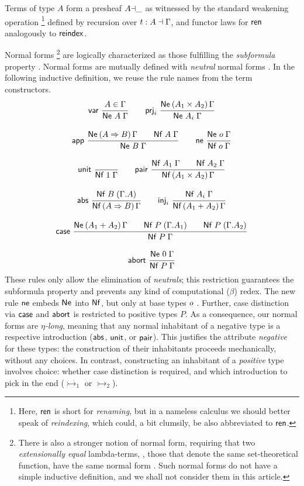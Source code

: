 \documentclass[sigplan,screen]{acmart}
\begin{document}
Terms of type $A$ form a presheaf
$A{\dashv}\_$ as witnessed by the standard weakening operation%
\footnote{Here, $\mathsf{ren}$ is short for \emph{renaming}, but in a nameless
calculus we should better speak of \emph{reindexing}, which could, a
bit clumsily, be also abbreviated to $\mathsf{ren}$.}
defined by recursion over $t : A \dashv \Gamma$,
and functor laws for $\mathsf{ren}$ analogously to $\mathsf{reindex}$.

Normal forms%
\footnote{%
There is also a stronger
notion of normal form, requiring that two \emph{extensionally equal}
lambda-terms, \ie, those that denote the
same set-theoretical function, have the same normal form
\cite{mitchell:foundations,altenkirchDybjerHofmannScott:lics01,scherer:popl17}.
Such normal forms do not have a simple inductive definition, and we
shall not consider them in this article.
}
are logically characterized as those fulfilling the
\emph{subformula} property \cite{prawitz:natded,matthes:shortproofs}.
Normal forms  are mutually defined with
\emph{neutral} normal forms .
In the following inductive definition, we reuse the rule names from the
term constructors.
\begin{gather*}
  \nru{\tvar}{A \in \Gamma}{\Ne A \Gamma}
\qquad
  \nru{\tprj_i}
    {\NeP {A_1 \times A_2} \Gamma}
    {\Ne {A_i} \Gamma}
\\[2ex]
  \nru{\tapp}
    {\NeP {A \To B} \Gamma \qquad \Nf A \Gamma}
    {\Ne B \Gamma}
\qquad
  \nru{\tne}{\Ne \tybase \Gamma}{\Nf \tybase \Gamma}
\\[2ex]
  \nru{\tunit}{}{\Nf \tyone \Gamma}
\qquad
  \nru{\tpair}
    {\Nf {A_1} \Gamma \qquad \Nf {A_2} \Gamma}
    {\NfP {A_1 \times A_2} \Gamma}
\\[2ex]
  \nru{\tabs}{\NfC B {\cext \Gamma A}}{\NfP {A \To B} \Gamma}
\qquad
  \nru{\tinj_i}
    {\Nf {A_i} \Gamma}
    {\NfP {A_1 + A_2} \Gamma}
\\[2ex]
  \nru{\tcase}
    {\NeP {A_1 + A_2} \Gamma
      \qquad \NfC P {\cext \Gamma A_1}
      \qquad \NfC P {\cext \Gamma A_2}
    }{\Nf P \Gamma}
\\[2ex]
  \nru{\tabort}
    {\Ne \tyzero \Gamma}
    {\Nf P \Gamma}
\end{gather*}
These rules only allow the elimination of \emph{neutrals}; this
restriction guarantees
the subformula property and prevents any kind of computational
($\beta$) redex.
The new rule $\mathsf{ne}$ embeds $\mathsf{Ne}^{}$ into $\mathsf{Nf}$,
but only at base types $o$ \cite[Section~3.3]{altenkirchHofmannStreicher:ctcs95}.
Further, case distinction via $\mathsf{case}$ and $\mathsf{abort}$
is restricted to positive types $P$.
As a consequence, our normal forms are
\emph{$\eta$-long}, meaning that any normal inhabitant of a negative
type is a respective introduction ($\mathsf{abs}$, $\mathsf{unit}$, or $\mathsf{pair}$).
This justifies the attribute \emph{negative} for these types:
the construction of their inhabitants proceeds mechanically, without
any choices.  In contrast, constructing an inhabitant of a
\emph{positive} type involves choice: whether case distinction is
required, and which introduction to pick in the end ($\tinj_1$ or $\tinj_2$).
\end{document}
